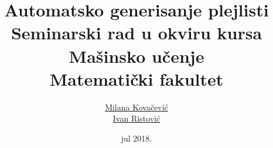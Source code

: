 \documentclass[a4paper]{article}
\theoremstyle{plain}
\theoremstyle{definition}
\begin{document}
\title{Automatsko generisanje plejlisti\\ \small{Seminarski rad u okviru kursa\\Ma\v{s}insko u\v{c}enje\\ Matematički fakultet}}

\author{\href{mailto:mi14031@matf.bg.ac.rs}{Milana Kova\v{c}evi\'c}\\\href{mailto:mi14042@matf.bg.ac.rs}{Ivan Ristovi\'c}}
\date{jul 2018.}

\maketitle



\tableofcontents

\newpage

%




\newpage

%
\end{document}
